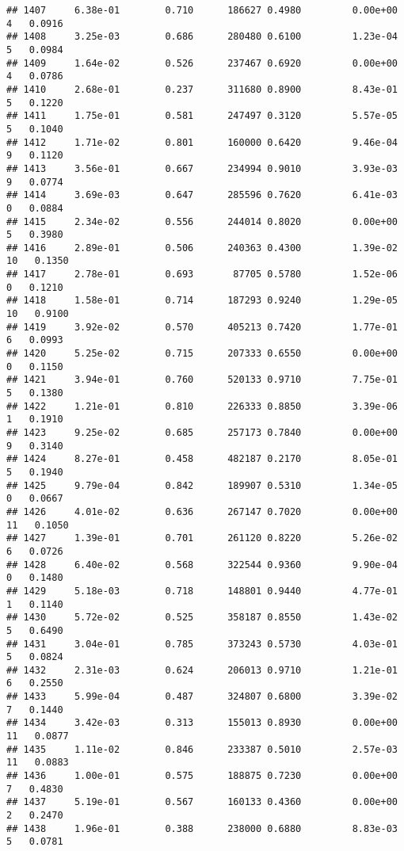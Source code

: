 \documentclass[
]{article}
\begin{document}
\begin{verbatim}
## 1407     6.38e-01        0.710      186627 0.4980         0.00e+00   4   0.0916
## 1408     3.25e-03        0.686      280480 0.6100         1.23e-04   5   0.0984
## 1409     1.64e-02        0.526      237467 0.6920         0.00e+00   4   0.0786
## 1410     2.68e-01        0.237      311680 0.8900         8.43e-01   5   0.1220
## 1411     1.75e-01        0.581      247497 0.3120         5.57e-05   5   0.1040
## 1412     1.71e-02        0.801      160000 0.6420         9.46e-04   9   0.1120
## 1413     3.56e-01        0.667      234994 0.9010         3.93e-03   9   0.0774
## 1414     3.69e-03        0.647      285596 0.7620         6.41e-03   0   0.0884
## 1415     2.34e-02        0.556      244014 0.8020         0.00e+00   5   0.3980
## 1416     2.89e-01        0.506      240363 0.4300         1.39e-02  10   0.1350
## 1417     2.78e-01        0.693       87705 0.5780         1.52e-06   0   0.1210
## 1418     1.58e-01        0.714      187293 0.9240         1.29e-05  10   0.9100
## 1419     3.92e-02        0.570      405213 0.7420         1.77e-01   6   0.0993
## 1420     5.25e-02        0.715      207333 0.6550         0.00e+00   0   0.1150
## 1421     3.94e-01        0.760      520133 0.9710         7.75e-01   5   0.1380
## 1422     1.21e-01        0.810      226333 0.8850         3.39e-06   1   0.1910
## 1423     9.25e-02        0.685      257173 0.7840         0.00e+00   9   0.3140
## 1424     8.27e-01        0.458      482187 0.2170         8.05e-01   5   0.1940
## 1425     9.79e-04        0.842      189907 0.5310         1.34e-05   0   0.0667
## 1426     4.01e-02        0.636      267147 0.7020         0.00e+00  11   0.1050
## 1427     1.39e-01        0.701      261120 0.8220         5.26e-02   6   0.0726
## 1428     6.40e-02        0.568      322544 0.9360         9.90e-04   0   0.1480
## 1429     5.18e-03        0.718      148801 0.9440         4.77e-01   1   0.1140
## 1430     5.72e-02        0.525      358187 0.8550         1.43e-02   5   0.6490
## 1431     3.04e-01        0.785      373243 0.5730         4.03e-01   5   0.0824
## 1432     2.31e-03        0.624      206013 0.9710         1.21e-01   6   0.2550
## 1433     5.99e-04        0.487      324807 0.6800         3.39e-02   7   0.1440
## 1434     3.42e-03        0.313      155013 0.8930         0.00e+00  11   0.0877
## 1435     1.11e-02        0.846      233387 0.5010         2.57e-03  11   0.0883
## 1436     1.00e-01        0.575      188875 0.7230         0.00e+00   7   0.4830
## 1437     5.19e-01        0.567      160133 0.4360         0.00e+00   2   0.2470
## 1438     1.96e-01        0.388      238000 0.6880         8.83e-03   5   0.0781

\end{verbatim}
\end{document}
